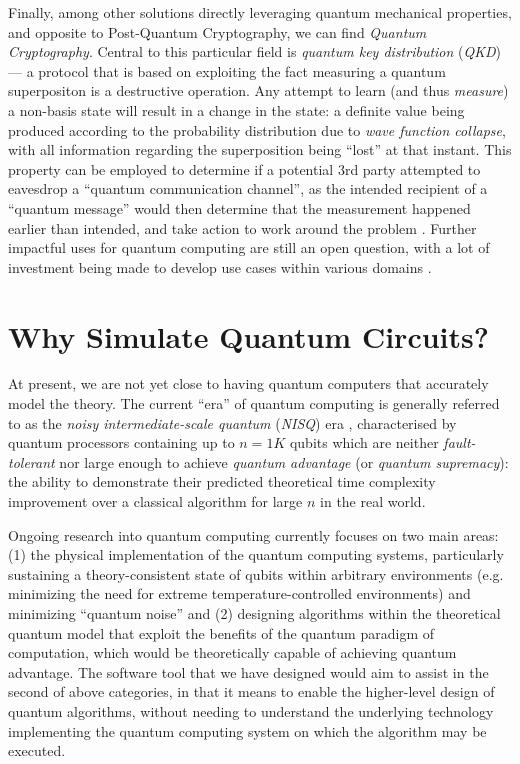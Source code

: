 \documentclass[conference]{IEEEtran}
\begin{document}
Finally, among other solutions directly leveraging quantum mechanical properties, and opposite to Post-Quantum Cryptography, we can find \textit{Quantum Cryptography}.
Central to this particular field is \textit{quantum key distribution} (\textit{QKD})
— a protocol that is based on exploiting the fact measuring a quantum superpositon is a destructive operation.
Any attempt to learn (and thus \textit{measure}) a non-basis state will result in a change in the state: a definite value being produced
according to the probability distribution due to \textit{wave function collapse}, with all information regarding the superposition
being ``lost'' at that instant.
This property can be employed to determine if a potential 3rd party attempted
to eavesdrop a ``quantum communication channel'', as the intended recipient
of a ``quantum message'' would then determine that the measurement happened earlier than intended,
and take action to work around the problem \cite{ref:quantumcomputingsincedemocritus,ref:advancesinquantumcryptography2020}.
Further impactful uses for quantum computing are still an open question,
with a lot of investment being made to develop use cases within various domains \cite{ref:xprizeforquantum}.


\section{Why Simulate Quantum Circuits?}
\label{sec:whySimulateQuantumCircuits}


At present, we are not yet close to having quantum computers that accurately
model the theory.
The current ``era'' of quantum computing is generally referred to as the  \textit{noisy intermediate-scale quantum}
(\textit{NISQ}) era \cite{ref:preskill2018quantum}, characterised by quantum processors containing up to $n=1K$ qubits which
are neither \textit{fault-tolerant} nor large
enough to achieve \textit{quantum advantage} (or \textit{quantum supremacy}): the ability to demonstrate their
predicted theoretical time complexity improvement over a classical algorithm for large $n$ in the real world.

Ongoing research into quantum computing currently focuses on two main areas: (1) the physical
implementation of the quantum computing systems, particularly sustaining a theory-consistent state of qubits within arbitrary
environments (e.g. minimizing the need for extreme temperature-controlled environments) and
minimizing ``quantum noise'' \cite{ref:resch2021benchmarking}
and (2) designing algorithms within the theoretical quantum model that exploit the benefits of the
quantum paradigm of computation, which would be theoretically capable of achieving quantum advantage.
The software tool that we have designed would aim to assist in the second of above categories, in that it means to
enable the higher-level design of quantum algorithms, without needing to understand the underlying technology implementing
the quantum computing system on which the algorithm may be executed.
\end{document}
